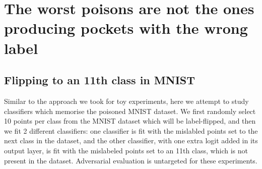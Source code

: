 \documentclass[12pt, oneside]{book}
\begin{document}



\section{The worst poisons are not the ones producing pockets with the wrong label}


\subsection{Flipping to an 11th class in MNIST}

Similar to the approach we took for toy experiments, here we attempt to study
classifiers which memorise the poisoned MNIST dataset. We first randomly select
10 points per class from the MNIST dataset which will be label-flipped, and then
we fit 2 different classifiers: one classifier is fit with the mislabled points
set to the next class in the dataset, and the other classifier, with one extra
logit added in its output layer, is fit with the mislabeled points set to an
11th class, which is not present in the dataset. Adversarial evaluation is
untargeted for these experiments.
\end{document}
